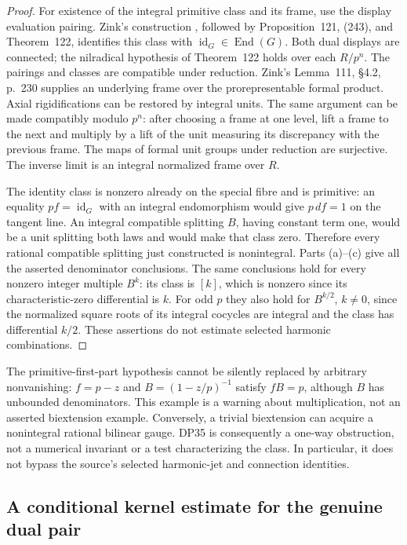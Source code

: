\documentclass[11pt,a4paper]{article}
\theoremstyle{definition}\newtheorem{remark}[theorem]{Remark}
\newcommand{\id}{\operatorname{id}}\newcommand{\Hom}{\operatorname{Hom}}
\begin{document}
\begin{proof}
For existence of the integral primitive class and its frame, use the display evaluation pairing. Zink's construction \cite[\S4.3, (216)--(218), pp.~238--239]{Zink}, followed by Proposition~121, (243), and Theorem~122, identifies this class with $\id_G\in\operatorname{End}(G)$. Both dual displays are connected; the nilradical hypothesis of Theorem~122 holds over each $R/p^n$. The pairings and classes are compatible under reduction. Zink's Lemma~111, \S4.2, p.~230 supplies an underlying frame over the prorepresentable formal product. Axial rigidifications can be restored by integral units. The same argument can be made compatibly modulo $p^n$: after choosing a frame at one level, lift a frame to the next and multiply by a lift of the unit measuring its discrepancy with the previous frame. The maps of formal unit groups under reduction are surjective. The inverse limit is an integral normalized frame over $R$.

The identity class is nonzero already on the special fibre and is primitive: an equality $pf=\id_G$ with an integral endomorphism would give $p\,df=1$ on the tangent line. An integral compatible splitting $B$, having constant term one, would be a unit splitting both laws and would make that class zero. Therefore every rational compatible splitting just constructed is nonintegral. Parts (a)--(c) give all the asserted denominator conclusions. The same conclusions hold for every nonzero integer multiple $B^k$: its class is $[k]$, which is nonzero since its characteristic-zero differential is $k$. For odd $p$ they also hold for $B^{k/2}$, $k\ne0$, since the normalized square roots of its integral cocycles are integral and the class has differential $k/2$. These assertions do not estimate selected harmonic combinations.
\end{proof}

The primitive-first-part hypothesis cannot be silently replaced by arbitrary nonvanishing: $f=p-z$ and $B=(1-z/p)^{-1}$ satisfy $fB=p$, although $B$ has unbounded denominators. This example is a warning about multiplication, not an asserted biextension example. Conversely, a trivial biextension can acquire a nonintegral rational bilinear gauge. DP35 is consequently a one-way obstruction, not a numerical invariant or a test characterizing the class. In particular, it does not bypass the source's selected harmonic-jet and connection identities.

\subsection{A conditional kernel estimate for the genuine dual pair}
\end{document}

